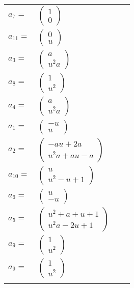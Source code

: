 \documentclass[1p]{elsarticle_modified}
\theoremstyle{definition}
\begin{document}
\begin{tabular}{m{7pt} m{180pt} m{7pt} m{180pt} }
\flushright $a_{7}=$&$\begin{pmatrix}1\\0\end{pmatrix}$ \\
\flushright $a_{11}=$&$\begin{pmatrix}0\\u\end{pmatrix}$ \\
\flushright $a_{3}=$&$\begin{pmatrix}a\\u^2 a\end{pmatrix}$ \\
\flushright $a_{8}=$&$\begin{pmatrix}1\\u^2\end{pmatrix}$ \\
\flushright $a_{4}=$&$\begin{pmatrix}a\\u^2 a\end{pmatrix}$ \\
\flushright $a_{1}=$&$\begin{pmatrix}- u\\u\end{pmatrix}$ \\
\flushright $a_{2}=$&$\begin{pmatrix}- a u+2 a\\u^2 a+a u- a\end{pmatrix}$ \\
\flushright $a_{10}=$&$\begin{pmatrix}u\\u^2- u+1\end{pmatrix}$ \\
\flushright $a_{6}=$&$\begin{pmatrix}u\\- u\end{pmatrix}$ \\
\flushright $a_{5}=$&$\begin{pmatrix}u^2+a+u+1\\u^2 a-2 u+1\end{pmatrix}$ \\
\flushright $a_{9}=$&$\begin{pmatrix}1\\u^2\end{pmatrix}$\\ \flushright $a_{9}=$&$\begin{pmatrix}1\\u^2\end{pmatrix}$\\&\end{tabular}
\end{document}
